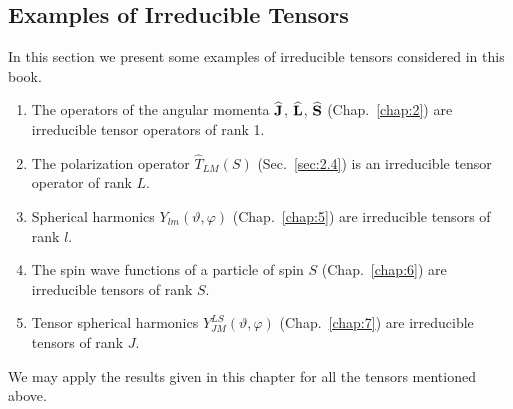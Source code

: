 \subsection{Examples of Irreducible Tensors}\label{sec:3.1.6}
In this section we present some examples of irreducible tensors considered in this book.
\begin{enumerate}[label=(\alph*)]
\item The operators of the angular momenta $\widehat{\mathbf{J}}$, $\widehat{\mathbf{L}}$, $\widehat{\mathbf{S}}$ (Chap.~\ref{chap:2}) are irreducible tensor operators of rank 1.
\item The polarization operator $\widehat{T}_{L M}(S)$ (Sec.~\ref{sec:2.4}) is an irreducible tensor operator of rank $L$.
\item Spherical harmonics $Y_{l m}(\vartheta, \varphi)$ (Chap.~\ref{chap:5}) are irreducible tensors of rank $l$.
\item The spin wave functions of a particle of spin $S$ (Chap.~\ref{chap:6}) are irreducible tensors of rank $S$.
\item Tensor spherical harmonics $Y_{J M}^{L S}(\vartheta, \varphi)$ (Chap.~\ref{chap:7}) are irreducible tensors of rank $J$.
\end{enumerate}
We may apply the results given in this chapter for all the tensors mentioned above.

